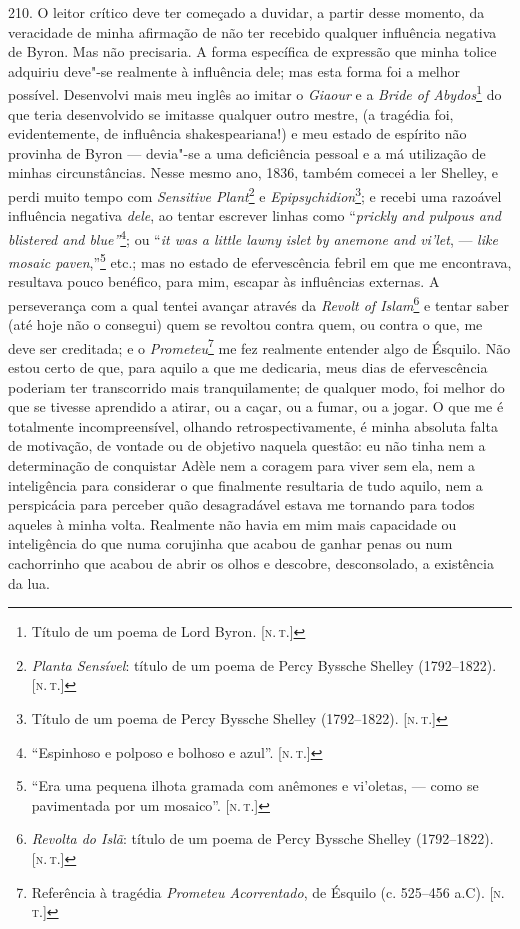 210. O leitor crítico deve ter começado a duvidar, a partir desse
momento, da veracidade de minha afirmação de não ter recebido qualquer
influência negativa de Byron. Mas não precisaria. A forma específica de
expressão que minha tolice adquiriu deve"-se realmente à influência dele;
mas esta forma foi a melhor possível. Desenvolvi mais meu inglês ao
imitar o \emph{Giaour} e a \emph{Bride of Abydos}\footnote{Título de um
  poema de Lord Byron. {[}\textsc{n.\,t.}{]}} do que teria desenvolvido se
imitasse qualquer outro mestre, (a tragédia foi, evidentemente, de
influência shakespeariana!) e meu estado de espírito não provinha de
Byron --- devia"-se a uma deficiência pessoal e a má utilização de minhas
circunstâncias. Nesse mesmo ano, 1836, também comecei a ler Shelley, e
perdi muito tempo com \emph{Sensitive Plant}\footnote{\emph{Planta
  Sensível}: título de um poema de Percy Byssche Shelley (1792--1822).
  {[}\textsc{n.\,t.}{]}} e \emph{Epipsychidion}\footnote{Título de um poema de
  Percy Byssche Shelley (1792--1822). {[}\textsc{n.\,t.}{]}}; e recebi uma
razoável influência negativa \emph{dele}, ao tentar escrever linhas como
``\emph{prickly and pulpous and blistered and blue''}\footnote{``Espinhoso
  e polposo e bolhoso e azul''. {[}\textsc{n.\,t.}{]}}; ou ``\emph{it was a
little lawny} \emph{islet by anemone and vi'let}, --- \emph{like mosaic
paven},''\footnote{``Era uma pequena ilhota gramada com anêmones e
  vi'oletas, --- como se pavimentada por um mosaico''. {[}\textsc{n.\,t.}{]}}
etc.; mas no estado de efervescência febril em que me encontrava,
resultava pouco benéfico, para mim, escapar às influências externas. A
perseverança com a qual tentei avançar através da \emph{Revolt of
Islam}\footnote{\emph{Revolta do Islã}: título de um poema de Percy
  Byssche Shelley (1792--1822). {[}\textsc{n.\,t.}{]}} e tentar saber (até hoje
não o consegui) quem se revoltou contra quem, ou contra o que, me deve
ser creditada; e o \emph{Prometeu}\footnote{Referência à tragédia
  \emph{Prometeu Acorrentado}, de Ésquilo (c. 525--456 a.C).
  {[}\textsc{n.\,t.}{]}} me fez realmente entender algo de Ésquilo. Não estou
certo de que, para aquilo a que me dedicaria, meus dias de efervescência
poderiam ter transcorrido mais tranquilamente; de qualquer modo, foi
melhor do que se tivesse aprendido a atirar, ou a caçar, ou a fumar, ou
a jogar. O que me é totalmente incompreensível, olhando
retrospectivamente, é minha absoluta falta de motivação, de vontade ou
de objetivo naquela questão: eu não tinha nem a determinação de
conquistar Adèle nem a coragem para viver sem ela, nem a inteligência
para considerar o que finalmente resultaria de tudo aquilo, nem a
perspicácia para perceber quão desagradável estava me tornando para
todos aqueles à minha volta. Realmente não havia em mim mais capacidade
ou inteligência do que numa corujinha que acabou de ganhar penas ou num
cachorrinho que acabou de abrir os olhos e descobre, desconsolado, a
existência da lua.

